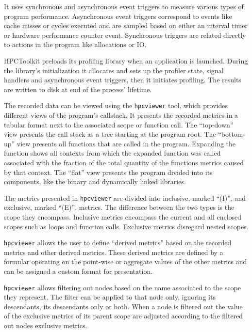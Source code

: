 \documentclass[a4paper, 11pt]{memoir}
\begin{document}
    It uses synchronous and asynchronous event triggers to measure various types of program performance. Asynchronous
    event triggers correspond to events like cache misses or cycles executed and are sampled based on either an interval
    timer or hardware performance counter event. Synchronous triggers are related directly to actions in the program like
    allocations or IO.

    HPCToolkit preloads its profiling library when an application is launched. During the library's initialization it
    allocates and sets up the profiler state, signal handlers and asynchronous event triggers, then it initiates profiling.
    The results are written to disk at end of the process' lifetime.

    The recorded data can be viewed using the \texttt{hpcviewer} tool, which provides different views of the
    program's callstack. It presents the recorded metrics in a tabular format next to the associated scope or function
    call. The \enquote{top-down} view presents the call stack as a tree starting at the program root. The \enquote{bottom-up}
    view presents all functions that are called in the program. Expanding the function shows all contexts from which the
    expanded function was called associated with the fraction of the total quantity of the functions metrics caused by
    that context. The \enquote{flat} view presents the program divided into its components, like the binary and dynamically
    linked libraries.

    The metrics presented in \texttt{hpcviewer} are divided into inclusive, marked \enquote{(I)}, and exclusive,
    marked \enquote{(E)}, metrics. The difference between the two types is the scope they encompass. Inclusive metrics
    encompass the current and all enclosed scopes such as loops and function calls. Exclusive metrics disregard nested
    scopes.

    \texttt{hpcviewer} allows the user to define \enquote{derived metrics} based on the recorded metrics and other
    derived metrics. These derived metrics are defined by a formular operating on the point-wise or aggregate values of
    the other metrics and can be assigned a custom format for presentation.

    \texttt{hpcviewer} allows filtering out nodes based on the name associated to the scope they represent. The
    filter can be applied to that node only, ignoring its descendants, its descendants only or both. When a node is filtered
    out the value of the exclusive metrics of its parent scope are adjusted according to the filtered out nodes exclusive
    metrics.
\end{document}
